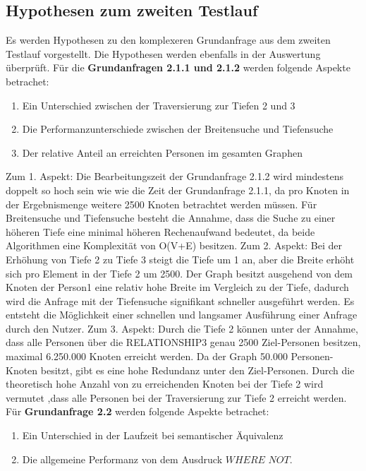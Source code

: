 \subsection{Hypothesen zum zweiten Testlauf}
Es werden Hypothesen zu den komplexeren Grundanfrage aus dem zweiten Testlauf vorgestellt. Die Hypothesen werden ebenfalls in der Auswertung überprüft. \newline \newline
Für die \textbf{Grundanfragen 2.1.1 und 2.1.2} werden folgende Aspekte betrachet: 
\begin{enumerate}
	\item Ein Unterschied zwischen der Traversierung zur Tiefen 2 und 3 
	\item Die Performanzunterschiede zwischen der Breitensuche und Tiefensuche
	\item Der relative Anteil an erreichten Personen im gesamten Graphen
\end{enumerate}
Zum 1. Aspekt: Die Bearbeitungszeit der Grundanfrage 2.1.2 wird mindestens doppelt so hoch sein wie wie die Zeit der Grundanfrage 2.1.1, da pro Knoten in der Ergebnismenge weitere 2500 Knoten betrachtet werden müssen. Für  Breitensuche und Tiefensuche besteht die Annahme, dass die Suche zu einer höheren Tiefe eine minimal höheren Rechenaufwand bedeutet, da beide Algorithmen eine Komplexität von O(V+E) besitzen. \newline
Zum 2. Aspekt: Bei der Erhöhung von Tiefe 2 zu Tiefe 3 steigt die Tiefe um 1 an, aber die Breite erhöht sich pro Element in der Tiefe 2 um 2500. Der Graph besitzt ausgehend von dem Knoten der Person1 eine relativ hohe Breite im Vergleich zu der Tiefe, dadurch wird die Anfrage mit der Tiefensuche signifikant schneller ausgeführt werden. Es entsteht die Möglichkeit einer schnellen und langsamer Ausführung einer Anfrage durch den Nutzer. \newline
Zum 3. Aspekt: Durch die Tiefe 2 können unter der Annahme, dass alle Personen über die RELATIONSHIP3 genau 2500 Ziel-Personen besitzen, maximal 6.250.000 Knoten erreicht werden. Da der Graph 50.000 Personen-Knoten besitzt, gibt es eine hohe Redundanz unter den Ziel-Personen. Durch die theoretisch hohe Anzahl von zu erreichenden Knoten bei der Tiefe 2 wird vermutet ,dass alle Personen bei der Traversierung zur Tiefe 2 erreicht werden. \newline \newline
Für \textbf{Grundanfrage 2.2} werden folgende Aspekte betrachet: 
\begin{enumerate}
	\item Ein Unterschied in der Laufzeit bei  semantischer Äquivalenz  
	\item Die allgemeine Performanz von dem Ausdruck $WHERE$ $NOT$.
\end{enumerate}
